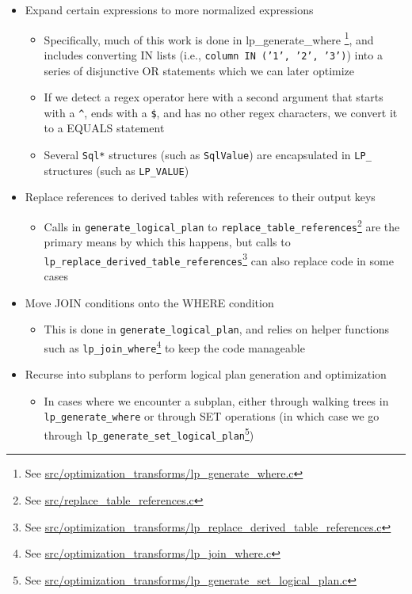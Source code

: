 \documentclass[]{article}
\def\code#1{\texttt{#1}}
\newcommand{\gitlab}[1]{\footnote{See \href{https://gitlab.com/YottaDB/DBMS/YDBOcto/blob/master/#1}{#1}}}
\begin{document}
\begin{itemize}
	\item Expand certain expressions to more normalized expressions
	\begin{itemize}
		\item Specifically, much of this work is done in lp\_generate\_where \gitlab{src/optimization\_transforms/lp\_generate\_where.c}, and includes converting IN lists (i.e., \code{column\ IN\ ('1', '2', '3')}) into a series of disjunctive OR statements which we can later optimize
		\item If we detect a regex operator here with a second argument that starts with a \code{\^}, ends with a \code{\$}, and has no other regex characters, we convert it to a EQUALS statement
		\item Several \code{Sql*} structures (such as \code{SqlValue}) are encapsulated in \code{LP\_} structures (such as \code{LP\_VALUE})
	\end{itemize}
	\item Replace references to derived tables with references to their output keys
	\begin{itemize}
		\item Calls in \code{generate\_logical\_plan} to \code{replace\_table\_references}\gitlab{src/replace\_table\_references.c} are the primary means by which this happens, but calls to \\ \code{lp\_replace\_derived\_table\_references}\gitlab{src/optimization\_transforms/lp\_replace\_derived\_table\_references.c} can also replace code in some cases
	\end{itemize}
	\item Move JOIN conditions onto the WHERE condition
	\begin{itemize}
		\item This is done in \code{generate\_logical\_plan}, and relies on helper functions such as \code{lp\_join\_where}\gitlab{src/optimization\_transforms/lp\_join\_where.c} to keep the code manageable
	\end{itemize}
	\item Recurse into subplans to perform logical plan generation and optimization
	\begin{itemize}
		\item In cases where we encounter a subplan, either through walking trees in \code{lp\_generate\_where} or through SET operations (in which case we go through \code{lp\_generate\_set\_logical\_plan}\gitlab{src/optimization\_transforms/lp\_generate\_set\_logical\_plan.c})
	\end{itemize}
\end{itemize}
\end{document}
